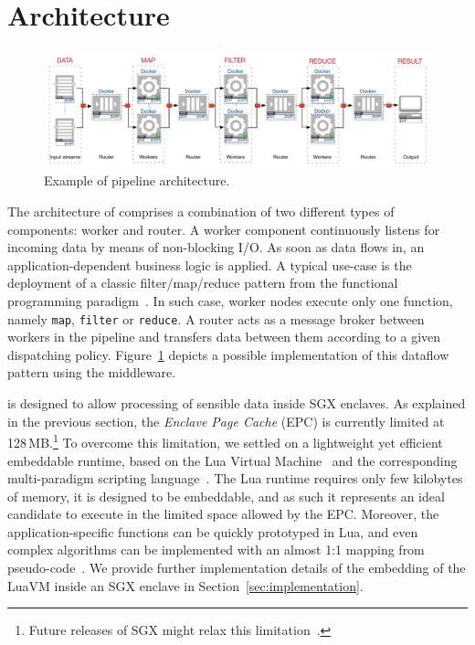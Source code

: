 \section{Architecture}
\label{sec:architecture}
\begin{figure}[!t]
  \centering
  \includegraphics[scale=0.5]{images/architecture_pipeline}
  \caption{Example of \SYS pipeline architecture.}
  \label{fig:architecture_pipeline}
\end{figure}


The architecture of \SYS{} comprises a combination of two different types of components: \textsf{worker} and \textsf{router}.
A worker component continuously listens for incoming data by means of non-blocking I/O.
As soon as data flows in, an application-dependent business logic is applied.
A typical use-case is the deployment of a classic filter/map/reduce pattern from the functional programming paradigm~\cite{bird_introduction_1988}.
In such case, worker nodes execute only one function, namely \texttt{map}, \texttt{filter} or \texttt{reduce}.
A router acts as a message broker between workers in the pipeline and transfers data between them according to a given dispatching policy.
Figure~\ref{fig:architecture_pipeline} depicts a possible implementation of this dataflow pattern using the \SYS middleware.

\SYS is designed to allow processing of sensible data inside SGX enclaves.
As explained in the previous section, the \emph{Enclave Page Cache} (EPC) is currently limited at 128\,MB.\footnote{Future releases of SGX might relax this limitation~\cite{mckeen2016intel}.}
To overcome this limitation, we settled on a lightweight yet efficient embeddable runtime, based on the Lua Virtual Machine~\cite{ierusalimschy_luaextensible_1996} and the corresponding multi-paradigm scripting language~\cite{lualang}.
The Lua runtime requires only few kilobytes of memory, it is designed to be embeddable, and as such it represents an ideal candidate to execute in the limited space allowed by the EPC.
Moreover, the application-specific functions can be quickly prototyped in Lua, and even complex algorithms can be implemented with an almost 1:1 mapping from pseudo-code~\cite{leonini2009splay}.
We provide further implementation details of the embedding of the LuaVM inside an SGX enclave in Section~\ref{sec:implementation}.

